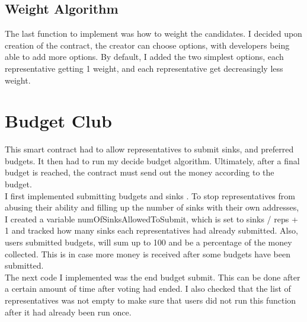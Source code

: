 \subsection{Weight Algorithm}
The last function to implement was how to weight the candidates. I decided upon creation of the contract, the creator can choose options, with developers being able to add more options. By default, I added the two simplest options, each representative getting 1 weight, and each representative get decreasingly less weight. \\
\section{Budget Club}
This smart contract had to allow representatives to submit sinks, and preferred budgets. It then had to run my decide budget algorithm. Ultimately, after a final budget is reached, the contract must send out the money according to the budget. \\
I first implemented submitting budgets and sinks . To stop representatives from abusing their ability and filling up the number of sinks with their own addresses, I created a variable numOfSinksAllowedToSubmit, which is set to sinks / reps + 1 and tracked how many sinks each representatives had already submitted. Also, users submitted budgets, will sum up to 100 and be a percentage of the money collected. This is in case more money is received after some budgets have been submitted. \\
The next code I implemented was the end budget submit. This can be done after a certain amount of time after voting had ended. I also checked that the list of representatives was not empty to make sure that users did not run this function after it had already been run once. \\
